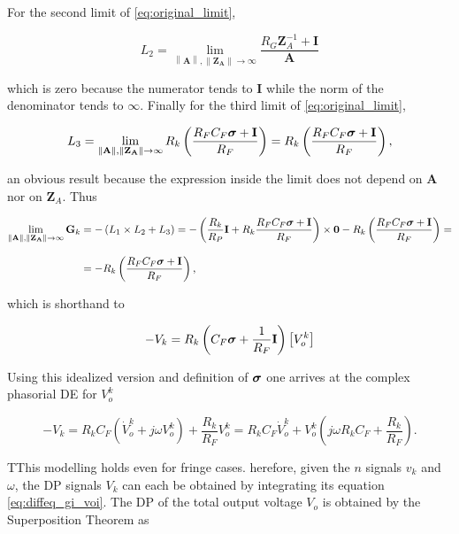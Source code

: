 	For the second limit of \eqref{eq:original_limit},

\begin{equation} L_2 = \lim\limits_{\left\lVert\mathbf{A}\right\rVert,\left\lVert\mathbf{Z_A}\right\rVert\to\infty } \dfrac{R_G\mathbf{Z}_A^{-1} + \mathbf{I}}{\mathbf{A}}  \end{equation}

	\noindent which is zero because the numerator tends to $\mathbf{I}$ while the norm of the denominator tends to $\infty$. Finally for the third limit of \eqref{eq:original_limit},

\begin{equation}
	L_3 = \lim\limits_{\left\lVert\mathbf{A}\right\rVert,\left\lVert\mathbf{Z_A}\right\rVert\to\infty } R_k\left(\dfrac{R_FC_F \boldsymbol{\sigma} + \mathbf{I}}{R_F}\right) = R_k\left(\dfrac{R_FC_F \boldsymbol{\sigma} + \mathbf{I}}{R_F}\right) ,
\end{equation}

	\noindent an obvious result because the expression inside the limit does not depend on $\mathbf{A}$ nor on $\mathbf{Z}_A$. Thus

\begin{align}
	\lim\limits_{\left\lVert\mathbf{A}\right\rVert,\left\lVert\mathbf{Z_A}\right\rVert\to\infty } \mathbf{G}_k &= -\left(L_1\times L_2 + L_3\right) = -\left(\dfrac{R_k}{R_P}\mathbf{I} + R_k\dfrac{R_FC_F \boldsymbol{\sigma} + \mathbf{I}}{R_F}\right) \times \mathbf{0} - R_k\left(\dfrac{R_FC_F \boldsymbol{\sigma} + \mathbf{I}}{R_F}\right) = \nonumber\\[3mm]
	&= -R_k\left(\dfrac{R_FC_F \boldsymbol{\sigma} + \mathbf{I}}{R_F}\right),
\end{align}

	\noindent which is shorthand to

\begin{equation} -V_k = R_k\left( C_F \boldsymbol{\sigma} + \dfrac{1}{R_F} \mathbf{I} \right) \left[ V_o^k\right] \label{eq:vo_vi_gi_diff}\end{equation}

	Using this idealized version and definition of $\boldsymbol{\sigma}$ one arrives at the complex phasorial DE for $V_o^k$

\begin{equation} -V_k = R_kC_F\left(\dot{V}_o^k + j\omega V_o^k\right) +\dfrac{R_k}{R_F}V_o^k = R_kC_F\dot{V}_o^k + V_o^k\left(j\omega R_kC_F + \dfrac{R_k}{R_F}\right) .\label{eq:diffeq_gi_voi}\end{equation}

	TThis modelling holds even for fringe cases. herefore, given the $n$ signals $v_k$ and $\omega$, the DP signals $V_k$ can each be obtained by integrating its equation \eqref{eq:diffeq_gi_voi}. The DP of the total output voltage $V_o$ is obtained by the Superposition Theorem as

